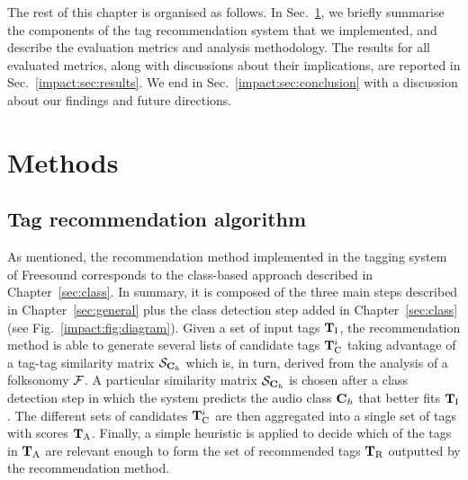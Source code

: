 The rest of this chapter is organised as follows. 
In Sec.~\ref{impact:sec:methodology}, we briefly summarise the components of the tag recommendation system that we implemented, and describe the evaluation metrics and analysis methodology. The results for all evaluated metrics, along with discussions about their implications, are reported in Sec.~\ref{impact:sec:results}. 
We end in Sec.~\ref{impact:sec:conclusion} with a discussion about our findings and future directions.


\section{Methods}
\label{impact:sec:methodology}


\subsection{Tag recommendation algorithm}
\label{impact:sec:tag_recommendation_system}

As mentioned, the recommendation method implemented in the tagging system of Freesound corresponds to the class-based approach described in Chapter~\ref{sec:class}.
In summary, it is composed of the three main steps described in Chapter~\ref{sec:general} plus the class detection step added in Chapter~\ref{sec:class} (see Fig.~\ref{impact:fig:diagram}).
Given a set of input tags $\mathbf{T}_{\text{I}}$, the recommendation method is able to generate several lists of candidate tags $\mathbf{T}_{\text{C}}^i$ taking advantage of a tag-tag similarity matrix $\mathcal{S}_{\mathbf{C}_{h}}$ which is, in turn, derived from the analysis of a folksonomy $\mathcal{F}$. 
A particular similarity matrix $\mathcal{S}_{\mathbf{C}_{h}}$ is chosen after a class detection step in which the system predicts the audio class $\mathbf{C}_{h}$ that better fits $\mathbf{T}_{\text{I}}$.
The different sets of candidates $\mathbf{T}_{\text{C}}^i$ are then aggregated into a single set of tags with scores $\mathbf{T}_{\text{A}}$.
Finally, a simple heuristic is applied to decide which of the tags in $\mathbf{T}_{\text{A}}$ are relevant enough to form the set of recommended tags $\mathbf{T}_{\text{R}}$ outputted by the recommendation method.

